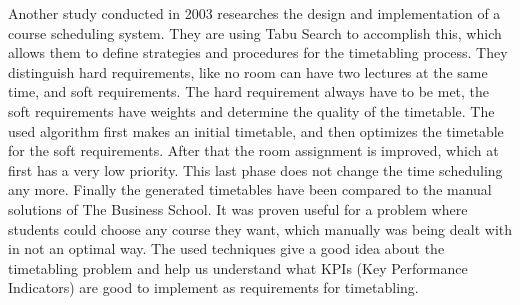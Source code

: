 Another study conducted in 2003 \cite{designAndImplementationOfACourseSchedulingSystem} researches the design and implementation of a course scheduling system. They are using Tabu Search to accomplish this, which allows them to define strategies and procedures for the timetabling process. They distinguish hard requirements, like no room can have two lectures at the same time, and soft requirements. The hard requirement always have to be met, the soft requirements have weights and determine the quality of the timetable. The used algorithm first makes an initial timetable, and then optimizes the timetable for the soft requirements. After that the room assignment is improved, which at first has a very low priority. This last phase does not change the time scheduling any more. Finally the generated timetables have been compared to the manual solutions of The Business School. It was proven useful for a problem where students could choose any course they want, which manually was being dealt with in not an optimal way.
The used techniques give a good idea about the timetabling problem and help us understand what KPIs (Key Performance Indicators) are good to implement as requirements for timetabling.
